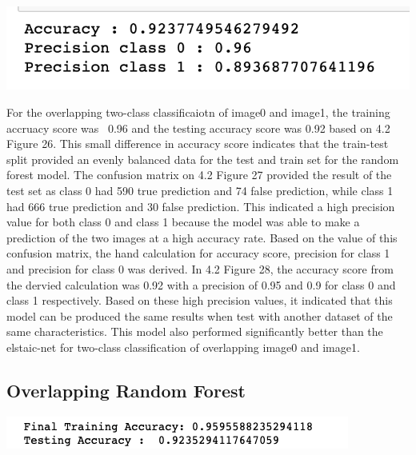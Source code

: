 \documentclass[12pt]{article}
\begin{document}
\begin{multicols*}{2}
\begin{center}
		\includegraphics[scale=0.5]{../screenshot/Rf-Non-Overlapping01/hand_score.png}
  \end{center}


  \hspace*{5mm} For the overlapping two-class classificaiotn of image0 and image1, the training accruacy score was ~0.96 and the testing
  accuracy score was 0.92 based on 4.2 Figure 26. This small difference in accuracy score indicates that the train-test split provided an evenly balanced data for the test and train
  set for the random forest model. The confusion matrix on 4.2 Figure 27 provided the result of the test set as class 0 had 590 true prediction and 74 false prediction,
  while class 1 had 666 true prediction and 30 false prediction. This indicated a high precision value for both class 0 and class 1 because the model
  was able to make a prediction of the two images at a high accuracy rate. Based on the value of this confusion matrix, the hand calculation for accuracy score,
  precision for class 1 and precision for class 0 was derived. In 4.2 Figure 28, the accuracy score from the dervied calculation was 0.92 with a precision of 0.95 and 0.9
  for class 0 and class 1 respectively. Based on these high precision values, it indicated that this model can be produced the same results when test with another
  dataset of the same characteristics. This model also performed significantly better than the elstaic-net for two-class classification of overlapping
  image0 and image1. 

  \subsection{Overlapping Random Forest} 
  \begin{center}
		\includegraphics[scale=0.5]{../screenshot/Rf-Overlapping01/score.png}


\end{center}
\end{multicols*}
\end{document}
